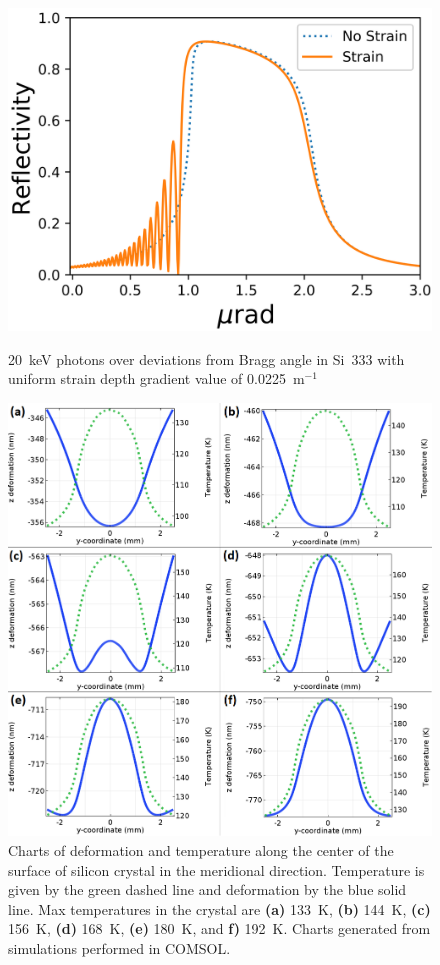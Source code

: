 \documentclass{iucr}
\begin{document}
\begin{figure}
\caption{20~keV photons over deviations from Bragg angle in Si~333 with uniform strain depth gradient value of 0.0225~m$^{-1}$}
\includegraphics[width = \textwidth]{images/333USG.png}
\label{fig:333USG}
\end{figure}

\begin{figure}

\caption{Charts of deformation and temperature along the center of the surface of silicon crystal in the meridional direction. Temperature is given by the green dashed line and deformation by the blue solid line. Max temperatures in the crystal are \textbf{(a)} 133~K, \textbf{(b)} 144~K, \textbf{(c)} 156~K, \textbf{(d)} 168~K, \textbf{(e)} 180~K, and \textbf{f)} 192~K. Charts generated from simulations performed in COMSOL.}
\includegraphics[width = \textwidth]{images/deformation.png}

\label{fig:ydeformation}
\end{figure}
\end{document}
